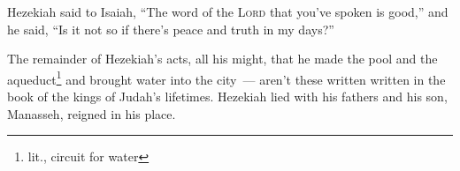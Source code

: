 
\begin{inparaenum}
    
    
    
    
     Hezekiah said to Isaiah, ``The word of the \textsc{Lord} that you've spoken is good,'' and he said, ``Is it not so if there's peace and truth in my days?''%
    
     The remainder of Hezekiah's acts, all his might, that he made the pool and the aqueduct\footnote{lit., circuit for water} and brought water into the city~--- aren't these written written in the book of the kings of Judah's lifetimes.%
     Hezekiah lied with his fathers and his son, Manasseh, reigned in his place.%
\end{inparaenum}
